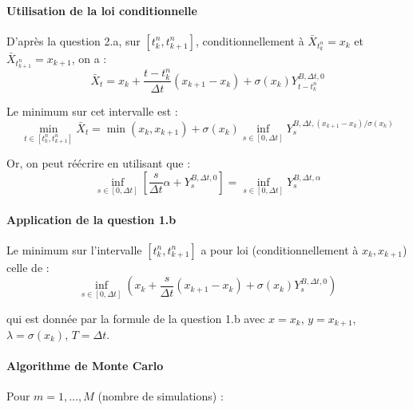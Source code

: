 \documentclass[12pt,a4paper]{article}
\theoremstyle{definition}
\theoremstyle{remark}
\begin{document}
\paragraph{Utilisation de la loi conditionnelle}

D'après la question 2.a, sur $[t_k^n, t_{k+1}^n]$, conditionnellement à $\bar{X}_{t_k^n} = x_k$ et $\bar{X}_{t_{k+1}^n} = x_{k+1}$, on a :
\[
\bar{X}_t = x_k + \frac{t - t_k^n}{\Delta t}(x_{k+1} - x_k) + \sigma(x_k)Y_{t-t_k^n}^{B,\Delta t, 0}
\]

Le minimum sur cet intervalle est :
\[
\min_{t \in [t_k^n, t_{k+1}^n]} \bar{X}_t = \min(x_k, x_{k+1}) + \sigma(x_k) \inf_{s \in [0,\Delta t]} Y_s^{B,\Delta t, (x_{k+1}-x_k)/\sigma(x_k)}
\]

Or, on peut réécrire en utilisant que :
\[
\inf_{s \in [0,\Delta t]} \left[\frac{s}{\Delta t}\alpha + Y_s^{B,\Delta t, 0}\right] = \inf_{s \in [0,\Delta t]} Y_s^{B,\Delta t, \alpha}
\]

\paragraph{Application de la question 1.b}

Le minimum sur l'intervalle $[t_k^n, t_{k+1}^n]$ a pour loi (conditionnellement à $x_k, x_{k+1}$) celle de :
\[
\inf_{s \in [0,\Delta t]} \left(x_k + \frac{s}{\Delta t}(x_{k+1} - x_k) + \sigma(x_k)Y_s^{B,\Delta t, 0}\right)
\]

qui est donnée par la formule de la question 1.b avec $x = x_k$, $y = x_{k+1}$, $\lambda = \sigma(x_k)$, $T = \Delta t$.

\paragraph{Algorithme de Monte Carlo}

Pour $m = 1, \ldots, M$ (nombre de simulations) :
\end{document}
